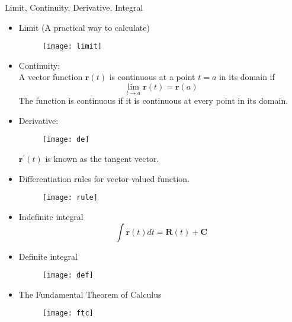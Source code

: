 \documentclass[10pt]{beamer}
\begin{document}
\begin{frame}[allowframebreaks]{Limit, Continuity, Derivative, Integral}
	
	\begin{itemize}
		\item Limit (A practical way to calculate)
		\begin{figure}[H]
			\centering
			\texttt{[image: limit]}
		\end{figure}
	
	\item Continuity:
	\\A vector function $\mathbf{r}(t)$ is continuous at a point $t = a$ in its domain if
	$$\lim_{t\rightarrow a}\mathbf{r}(t) = \mathbf{r}(a)$$
	The function is {\color{red}continuous} if it is {\color{red}continuous} at every point in its domain.

	\item Derivative:
	\begin{figure}[H]
		\centering
		\texttt{[image: de]}
	\end{figure}
	\noindent $\mathbf{r}^\prime(t)$ is known as the {\color{red}tangent vector}.
	
	\item Differentiation rules for vector-valued function.
	\begin{figure}[H]
		\centering
		\texttt{[image: rule]}
	\end{figure}
	
	\item Indefinite integral
	$$\int\mathbf{r}(t)dt = \mathbf{R}(t) + \mathbf{C}$$
	
	\item Definite integral
	\begin{figure}[H]
		\centering
	\texttt{[image: def]}
	\end{figure}
	
	\item The Fundamental Theorem of Calculus
	\begin{figure}[H]
		\centering
		\texttt{[image: ftc]}
	\end{figure}
	
	\end{itemize}
	
\end{frame}
\end{document}
